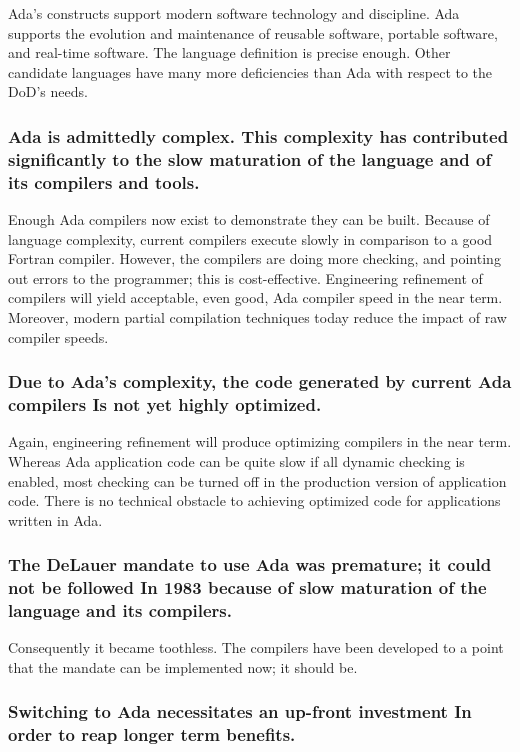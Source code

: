 \documentclass[12pt,final]{article}
\begin{document}
Ada’s constructs support modern software technology and discipline. Ada
supports the evolution and maintenance of reusable software, portable software,
and real-time software. The language definition is precise enough.  Other
candidate languages have many more deficiencies than Ada with respect to the
DoD’s needs.

\subsubsection*{Ada is admittedly complex. This complexity has contributed
significantly to the slow maturation of the language and of its compilers and
tools.}

Enough Ada compilers now exist to demonstrate they can be built. Because of
language complexity, current compilers execute slowly in comparison to a good
Fortran compiler. However, the compilers are doing more checking, and pointing
out errors to the programmer; this is cost-effective. Engineering refinement of
compilers will yield acceptable, even good, Ada compiler speed in the near
term. Moreover, modern partial compilation techniques today reduce the impact
of raw compiler speeds.

\subsubsection*{Due to Ada’s complexity, the code generated by current Ada
compilers Is not yet highly optimized.}

Again, engineering refinement will produce optimizing compilers in the near
term. Whereas Ada application code can be quite slow if all dynamic checking
is enabled, most checking can be turned off in the production version of
application code. There is no technical obstacle to achieving optimized code
for applications written in Ada.

\subsubsection*{The DeLauer mandate to use Ada was premature; it could not be
followed In 1983 because of slow maturation of the language and its
compilers.}

Consequently it became toothless. The compilers have been developed to a point
that the mandate can be implemented now; it should be.

\subsubsection*{Switching to Ada necessitates an up-front investment In order
to reap longer term benefits.}
\end{document}

